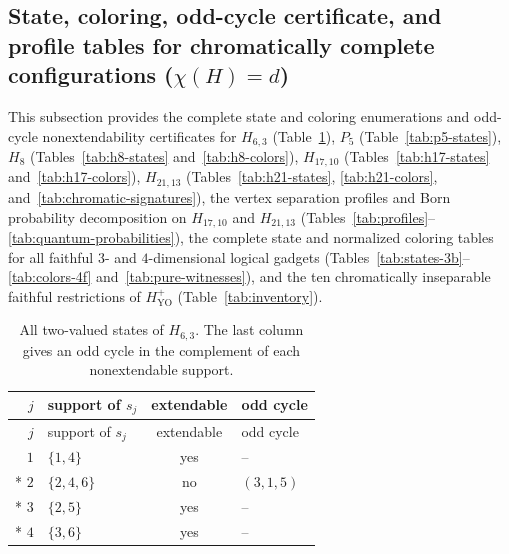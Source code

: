 \documentclass[aps,pra,reprint,superscriptaddress,longbibliography,nofootinbib,floatfix,10pt]{revtex4-2}
\theoremstyle{definition}
\newcommand{\YO}{\mathrm{YO}}
\begin{document}
\subsection{State, coloring, odd-cycle certificate, and profile tables for chromatically complete configurations (\texorpdfstring{$\chi(H)=d$}{chi(H)=d})}

This subsection provides the complete state and coloring enumerations and odd-cycle nonextendability certificates for $H_{6,3}$ (Table~\ref{tab:h6-states}), $P_5$ (Table~\ref{tab:p5-states}), $H_8$ (Tables~\ref{tab:h8-states} and~\ref{tab:h8-colors}), $H_{17,10}$ (Tables~\ref{tab:h17-states} and~\ref{tab:h17-colors}), $H_{21,13}$ (Tables~\ref{tab:h21-states}, \ref{tab:h21-colors}, and~\ref{tab:chromatic-signatures}), the vertex separation profiles and Born probability decomposition on $H_{17,10}$ and $H_{21,13}$ (Tables~\ref{tab:profiles}--\ref{tab:quantum-probabilities}), the complete state and normalized coloring tables for all faithful $3$- and $4$-dimensional logical gadgets (Tables~\ref{tab:states-3b}--\ref{tab:colors-4f} and~\ref{tab:pure-witnesses}), and the ten chromatically inseparable faithful restrictions of $H_{\YO}^{+}$ (Table~\ref{tab:inventory}).

\begingroup\small\setlength{\LTpre}{6pt}\setlength{\LTpost}{8pt}
\begin{longtable}{rlcl}
\caption{All two-valued states of $H_{6,3}$. The last column gives an odd cycle in the complement of each nonextendable support.}\label{tab:h6-states}\\
\toprule $j$ & support of $s_j$ & extendable & odd cycle\\\midrule
\endfirsthead
\toprule $j$ & support of $s_j$ & extendable & odd cycle\\\midrule
\endhead
\bottomrule\endfoot
$1$ & $\{1,4\}$ & yes & -- \\*
$2$ & $\{2,4,6\}$ & no & $(3,1,5)$ \\*
$3$ & $\{2,5\}$ & yes & -- \\*
$4$ & $\{3,6\}$ & yes & -- \\
\end{longtable}\endgroup
\end{document}
